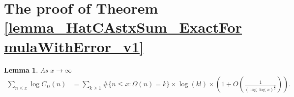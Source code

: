 \documentclass[11pt,reqno,a4letter]{article}
\newcommand{\hlocalref}[1]{\hyperref[#1]{\ref{#1}}}
\numberwithin{equation}{section}
\numberwithin{figure}{section}
\numberwithin{table}{section}
\theoremstyle{plain}
\newtheorem{lemma}[theorem]{Lemma}
\numberwithin{theorem}{section}
\theoremstyle{definition}
\theoremstyle{remark}
\begin{document}
\section{The proof of Theorem \hlocalref{lemma_HatCAstxSum_ExactFormulaWithError_v1}} 
\label{Appendix_ProofOfCOmegan_LogarithmicAvgOrderFormula}

\begin{lemma}
\label{lemma_eqn_proof_tag_SumLogCOmegan_P0_exp_v1}
As $x \rightarrow \infty$  
\begin{align}
\label{eqn_proof_tag_SumLogCOmegan_P0_exp_v1}
\sum_{n \leq x} \log C_{\Omega}(n) & = 
	\sum_{k \geq 1} \#\{n \leq x: \Omega(n)=k\} \times \log(k!) \times 
     \left(1 + O\left(\frac{1}{(\log\log x)^{\frac{1}{3}}}\right)\right). 
\end{align}
\end{lemma}
\end{document}
